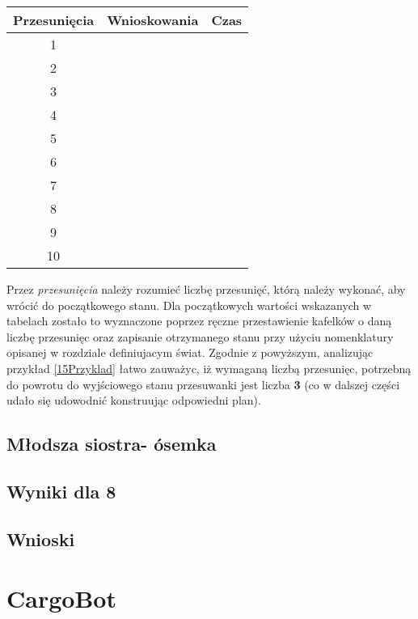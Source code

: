     \begin{table}[H]
        \centering
         \begin{tabular}{||c | c | c|} 
         \hline
         Przesunięcia & Wnioskowania & Czas \\ [0.5ex] 
         \hline\hline
         1 &  &  \\ 
         \hline
         2 &  &  \\
         \hline
         3 &  &   \\
         \hline
         4 &  &   \\
         \hline
         5 &  &  \\
         \hline
         6 &  &  \\ 
         \hline
         7 &  &  \\
         \hline
         8 &  &   \\
         \hline
         9 &  &   \\
         \hline
         10 &  &  \\ [1ex]
         \hline
         \end{tabular}
    \end{table}
    Przez \textit{przesunięcia} należy rozumieć liczbę przesunięć, którą należy wykonać, aby wrócić do początkowego stanu. Dla początkowych wartości 
    wskazanych w tabelach zostało to wyznaczone poprzez ręczne przestawienie kafelków o daną liczbę przesunięc oraz zapisanie otrzymanego stanu 
    przy użyciu nomenklatury opisanej w rozdziale definiujacym świat. Zgodnie z powyższym, analizując przykład \ref{15Przyklad} łatwo zauważyc, 
    iż wymaganą liczbą przesunięc, potrzebną do powrotu do wyjściowego stanu przesuwanki jest liczba \textbf{3} (co w dalszej części udało się 
    udowodnić konstruując odpowiedni plan).


    \subsection{Młodsza siostra- ósemka}

    \subsection{Wyniki dla 8}
    \subsection{Wnioski}
\section{CargoBot}
\label{CargoBotTest}
